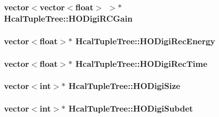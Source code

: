 \subsubsection[{H\+O\+Digi\+R\+C\+Gain}]{\setlength{\rightskip}{0pt plus 5cm}vector$<$vector$<$float$>$ $>$$\ast$ Hcal\+Tuple\+Tree\+::\+H\+O\+Digi\+R\+C\+Gain}\label{class_hcal_tuple_tree_a760900f2eccc37b9c8efc78b6af457fa}
\hypertarget{class_hcal_tuple_tree_a74256e07cba2a77b6d96c50e5dbcab2f}{}
\subsubsection[{H\+O\+Digi\+Rec\+Energy}]{\setlength{\rightskip}{0pt plus 5cm}vector$<$float$>$$\ast$ Hcal\+Tuple\+Tree\+::\+H\+O\+Digi\+Rec\+Energy}\label{class_hcal_tuple_tree_a74256e07cba2a77b6d96c50e5dbcab2f}
\hypertarget{class_hcal_tuple_tree_a518d0a94b9cc0ca05a72210dd907a932}{}
\subsubsection[{H\+O\+Digi\+Rec\+Time}]{\setlength{\rightskip}{0pt plus 5cm}vector$<$float$>$$\ast$ Hcal\+Tuple\+Tree\+::\+H\+O\+Digi\+Rec\+Time}\label{class_hcal_tuple_tree_a518d0a94b9cc0ca05a72210dd907a932}
\hypertarget{class_hcal_tuple_tree_a474c798a52945bf3edef9637b3577e75}{}
\subsubsection[{H\+O\+Digi\+Size}]{\setlength{\rightskip}{0pt plus 5cm}vector$<$int$>$$\ast$ Hcal\+Tuple\+Tree\+::\+H\+O\+Digi\+Size}\label{class_hcal_tuple_tree_a474c798a52945bf3edef9637b3577e75}
\hypertarget{class_hcal_tuple_tree_a19e6167120f3b6e5d9a93340ed80d334}{}
\subsubsection[{H\+O\+Digi\+Subdet}]{\setlength{\rightskip}{0pt plus 5cm}vector$<$int$>$$\ast$ Hcal\+Tuple\+Tree\+::\+H\+O\+Digi\+Subdet}\label{class_hcal_tuple_tree_a19e6167120f3b6e5d9a93340ed80d334}
\hypertarget{class_hcal_tuple_tree_a6a440ac41ccfdf350de9344c160cd2d4}{}
